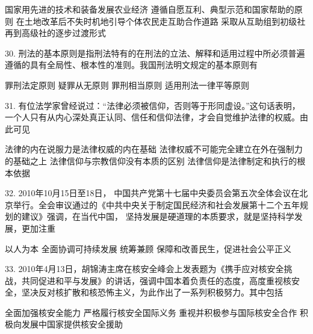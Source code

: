 \begin{choices}
	 国家用先进的技术和装备发展农业经济
	 遵循自愿互利、典型示范和国家帮助的原则
	 在土地改革后不失时机地引导个体农民走互助合作道路
	 采取从互助组到初级社再到高级社的逐步过渡形式
\end{choices}
30. 刑法的基本原则是指刑法特有的在刑法的立法、解释和适用过程中所必须普遍遵循的具有全局性、根本性的准则。我国刑法明文规定的基本原则有
\begin{choices}
	 罪刑法定原则
	 疑罪从无原则
	 罪刑相当原则
	 适用刑法一律平等原则
\end{choices}
31. 有位法学家曾经说过：“法律必须被信仰，否则等于形同虚设。”这句话表明，一个人只有从内心深处真正认同、信任和信仰法律，才会自觉维护法律的权威。由此可见
\begin{choices}
	 法律的内在说服力是法律权威的内在基础
	 法律权威不可能完全建立在外在强制力的基础之上
	 法律信仰与宗教信仰没有本质的区别
	 法律信仰是法律制定和执行的根本依据
\end{choices}
32. 2010年10月15日至18日， 中国共产党第十七届中央委员会第五次全体会议在北京举行。全会审议通过的《中共中央关于制定国民经济和社会发展第十二个五年规划的建议》强调，在当代中国， 坚持发展是硬道理的本质要求，就是坚持科学发展，更加注重
\begin{choices}
	 以人为本
	 全面协调可持续发展
	 统筹兼顾
	 保障和改善民生，促进社会公平正义
\end{choices}
33. 2010年4月13日，胡锦涛主席在核安全峰会上发表题为《携手应对核安全挑战，共同促进和平与发展》的讲话，强调中国本着负责任的态度，高度重视核安全，坚决反对核扩散和核恐怖主义，为此作出了一系列积极努力。其中包括
\begin{choices}
	 全面加强核安全能力
	 严格履行核安全国际义务
	 重视并积极参与国际核安全合作
	 积极向发展中国家提供核安全援助
\end{choices}
\vspace{6pt}
